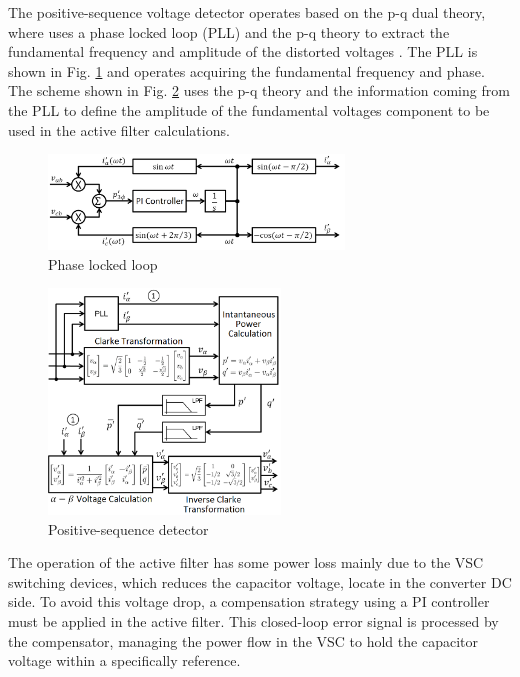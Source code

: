 The positive-sequence voltage detector operates based on the p-q dual theory, where uses a phase locked loop (PLL) and the p-q theory to extract the fundamental frequency and amplitude of the distorted voltages \citep{Akagi2007}. The PLL is shown in Fig. \ref{fig:PLL.png} and operates acquiring the fundamental frequency and phase. The scheme shown in Fig. \ref{fig:detector_seq_positiva.png} uses the p-q theory and the information coming from the PLL to define the amplitude of the fundamental voltages component to be used in the active filter calculations.


\begin{figure}[!b]
	\centering
	\includegraphics[width=0.70\textwidth]{Figures/PLL.png}
	\caption{Phase locked loop}
	\label{fig:PLL.png}
\end{figure}

\begin{figure}[!b]
	\centering
	\includegraphics[width=0.55\textwidth]{Figures/detector_seq_positiva.png}
	\caption{Positive-sequence detector}
	\label{fig:detector_seq_positiva.png}
\end{figure}

The operation of the active filter has some power loss mainly due to the VSC switching devices, which reduces the capacitor voltage, locate in the converter DC side. To avoid this voltage drop, a compensation strategy using a PI controller must be applied in the active filter. This closed-loop error signal is processed by the compensator, managing the power flow in the VSC to hold the capacitor voltage within a specifically reference.
